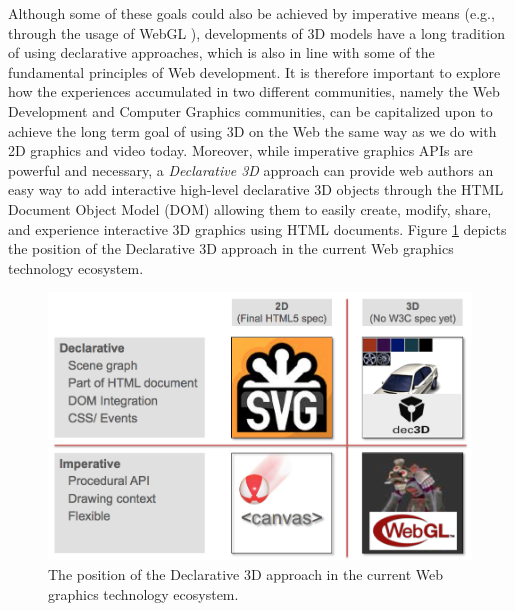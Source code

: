 \documentclass[review]{acmsiggraph}
\begin{document}
Although some of these goals could also be achieved by imperative means (e.g., through the usage of WebGL \cite{WebGL12}), developments of 3D models have a long tradition of using declarative approaches, which is also in line with some of the fundamental principles of Web development. It is therefore important to explore how the experiences accumulated in two different communities, namely the Web Development and Computer Graphics communities, can be capitalized upon to achieve the long term goal of using 3D on the Web the same way as we do with 2D graphics and video today.
Moreover, while imperative graphics APIs are powerful and necessary, a \emph{Declarative 3D} approach can provide web authors an easy way to add interactive high-level declarative 3D objects through the HTML Document Object Model (DOM) allowing them to easily create, modify, share, and experience interactive 3D graphics using HTML documents. Figure \ref{fig:DeclarativeVsImperative} depicts the position of the Declarative 3D approach in the current Web graphics technology ecosystem.

\begin{figure}%
  \centering
  \includegraphics[width=1.0\columnwidth]{images/Declarative3d.png}
  \caption{The position of the Declarative 3D approach in the current Web graphics technology ecosystem.}
  \label{fig:DeclarativeVsImperative}
\end{figure}
\end{document}
